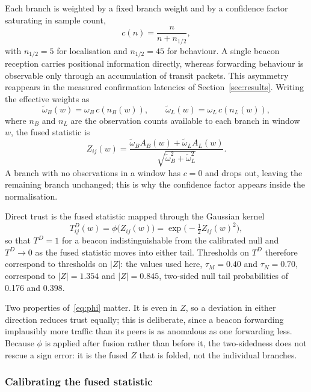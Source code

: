 Each branch is weighted by a fixed branch weight and by a confidence factor
saturating in sample count,
\begin{equation}
\label{eq:conf}
c(n) = \frac{n}{n + n_{1/2}},
\end{equation}
with $n_{1/2} = 5$ for localisation and $n_{1/2} = 45$ for behaviour. A single
beacon reception carries positional information directly, whereas forwarding
behaviour is observable only through an accumulation of transit packets. This
asymmetry reappears in the measured confirmation latencies of
Section~\ref{sec:results}. Writing the effective weights as
\begin{equation}
\label{eq:effw}
\tilde\omega_B(w) = \omega_B\, c(n_B(w)), \qquad
\tilde\omega_L(w) = \omega_L\, c(n_L(w)),
\end{equation}
where $n_B$ and $n_L$ are the observation counts available to each branch in
window $w$, the fused statistic is
\begin{equation}
\label{eq:stouffer}
Z_{ij}(w) = \frac{\tilde\omega_B A_B(w) + \tilde\omega_L A_L(w)}
                 {\sqrt{\tilde\omega_B^2 + \tilde\omega_L^2}}.
\end{equation}
A branch with no observations in a window has $c = 0$ and drops out, leaving
the remaining branch unchanged; this is why the confidence factor appears
inside the normalisation.

Direct trust is the fused statistic mapped through the Gaussian kernel
\begin{equation}
\label{eq:phi}
T^D_{ij}(w) = \phi\bigl(Z_{ij}(w)\bigr) = \exp\bigl(-\tfrac12 Z_{ij}(w)^2\bigr),
\end{equation}
so that $T^D = 1$ for a beacon indistinguishable from the calibrated null and
$T^D \to 0$ as the fused statistic moves into either tail. Thresholds on $T^D$
therefore correspond to thresholds on $|Z|$: the values used here,
$\tau_M = 0.40$ and $\tau_N = 0.70$, correspond to $|Z| = 1.354$ and
$|Z| = 0.845$, two-sided null tail probabilities of 0.176 and 0.398.

Two properties of~\eqref{eq:phi} matter. It is even in $Z$, so a deviation in
either direction reduces trust equally; this is deliberate, since a beacon
forwarding implausibly more traffic than its peers is as anomalous as one
forwarding less. Because $\phi$ is applied after fusion rather than before
it, the two-sidedness does not rescue a sign error: it is the fused $Z$ that is
folded, not the individual branches.

\subsubsection{Calibrating the fused statistic}
\label{sec:calib}

